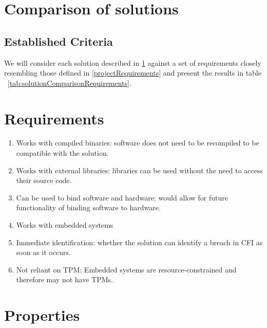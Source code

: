 \section{Comparison of solutions} \label{comparisonOfCFISolutions}

\subsection{Established Criteria}\label{requirementsIntro}

We will consider each solution described in \ref{comparisonOfCFISolutions} against a set of requirements closely resembling those defined in \ref{projectRequirements} and present the results in table ~\ref{tab:solutionComparisonRequirements}.

\section{Requirements}\label{Requirements}

\begin{enumerate}[label=(\arabic*),noitemsep]
	\item Works with compiled binaries: software does not need to be recompiled to be compatible with the solution.
	\item Works with external libraries: libraries can be used without the need to access their source code.
	\item Can be used to bind software and hardware: would allow for future functionality of binding software to hardware.
	\item Works with embedded systems
	\item Immediate identification: whether the solution can identify a breach in CFI as soon as it occurs.
	\item Not reliant on TPM: Embedded systems are resource-constrained and therefore may not have TPMs.
\end{enumerate}

\section{Properties}\label{Properties}

